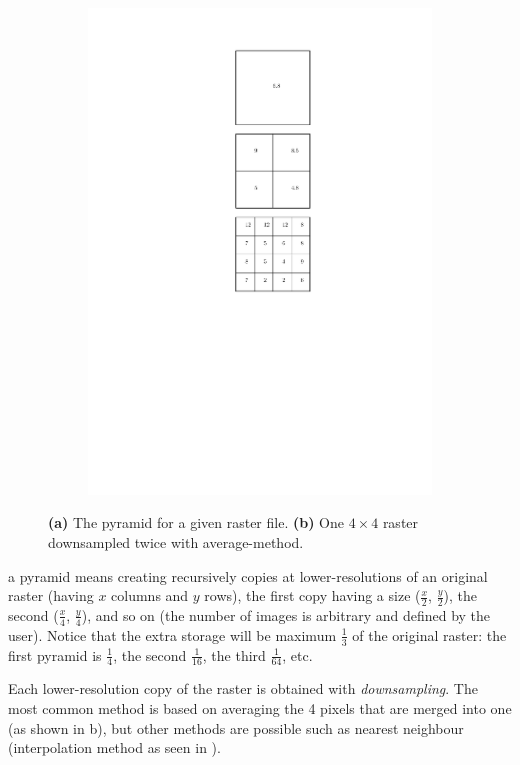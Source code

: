 \begin{figure}
\begin{subfigure}[b]{0.2\linewidth}
    \includegraphics[width=\textwidth]{figs/pyramids2.pdf}
    \caption{}
  \end{subfigure}
\caption{\textbf{(a)} The pyramid for a given raster file. \textbf{(b)} One $4\times4$ raster downsampled twice with average-method.}%
\end{figure}
a pyramid means creating recursively copies at lower-resolutions of an original raster (having $x$ columns and $y$ rows), the first copy having a size ($\frac{x}{2}$, $\frac{y}{2}$), the second ($\frac{x}{4}$, $\frac{y}{4}$), and so on (the number of images is arbitrary and defined by the user).
Notice that the extra storage will be maximum $\frac{1}{3}$ of the original raster: the first pyramid is $\frac{1}{4}$, the second $\frac{1}{16}$, the third $\frac{1}{64}$, etc.

Each lower-resolution copy of the raster is obtained with \emph{downsampling}.
The most common method is based on averaging the 4 pixels that are merged into one (as shown in b), but other methods are possible such as nearest neighbour (interpolation method as seen in ).


